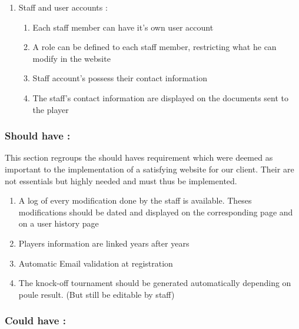 \begin{enumerate}
\begin{enumerate}
{ handed to the players}
\item \textcolor{blue} {A specific page indicate results at the end 
of the day}
\end{enumerate}
\item Staff and user accounts : \newline
\begin{enumerate} \itemsep1pt
\item \textcolor{green!60!black} {Each staff member can have it's own user account}
\item \textcolor{green!60!black} {A role can be defined to each staff member, 
restricting what he can modify in the website}
\item \textcolor{green!60!black} {Staff account's possess their contact information}
\item \textcolor{green!60!black} {The staff's contact information are displayed 
on the documents sent to the player}
\end{enumerate}
\end{enumerate}

\subsubsection{Should have :}
\label{Should have}

This section regroups the should haves requirement which were deemed as important
to the implementation of a satisfying website for our client. Their are not essentials
but highly needed and must thus be implemented. \newline

\begin{enumerate} \itemsep1pt
\item \textcolor{green!60!black} {A log of every modification done by the staff 
is available. Theses modifications should be dated and displayed on the 
corresponding page and on a user history page}
\item \textcolor{green!60!black} {Players information are linked years after years}
\item \textcolor{green!60!black} {Automatic Email validation at registration}
\item \textcolor{green!60!black} {The knock-off tournament should be generated 
automatically depending on poule result. (But still be editable by staff)}
\end{enumerate}

\subsubsection{Could have :}
\label{Could have}

